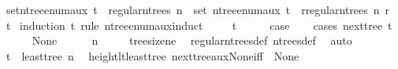 \begin{isabellebody}
{\isafoldproof}%
%
\isadelimproof
\isanewline
%
\endisadelimproof
\isanewline
{}\isamarkupfalse%
\ set{\isacharunderscore}{\kern0pt}n{\isacharunderscore}{\kern0pt}tree{\isacharunderscore}{\kern0pt}enum{\isacharunderscore}{\kern0pt}aux{\isacharcolon}{\kern0pt}\ {\isachardoublequoteopen}t\ {\isasymin}\ regular{\isacharunderscore}{\kern0pt}n{\isacharunderscore}{\kern0pt}trees\ n\ {\isasymLongrightarrow}\ set\ {\isacharparenleft}{\kern0pt}n{\isacharunderscore}{\kern0pt}tree{\isacharunderscore}{\kern0pt}enum{\isacharunderscore}{\kern0pt}aux\ t{\isacharparenright}{\kern0pt}\ {\isacharequal}{\kern0pt}\ {\isacharbraceleft}{\kern0pt}r{\isasymin}regular{\isacharunderscore}{\kern0pt}n{\isacharunderscore}{\kern0pt}trees\ n{\isachardot}{\kern0pt}\ r\ {\isasymle}\ t{\isacharbraceright}{\kern0pt}{\isachardoublequoteclose}\isanewline
%
\isadelimproof
%
\endisadelimproof
%
\isatagproof
{}\isamarkupfalse%
\ {\isacharparenleft}{\kern0pt}induction\ t\ rule{\isacharcolon}{\kern0pt}\ n{\isacharunderscore}{\kern0pt}tree{\isacharunderscore}{\kern0pt}enum{\isacharunderscore}{\kern0pt}aux{\isachardot}{\kern0pt}induct{\isacharparenright}{\kern0pt}\isanewline
\ \ \isamarkupfalse%
\ {\isacharparenleft}{\kern0pt}{}\ t{\isacharparenright}{\kern0pt}\isanewline
\ \ \isamarkupfalse%
\ \isamarkupfalse%
\ {\isacharquery}{\kern0pt}case\isanewline
\ \ \isamarkupfalse%
\ {\isacharparenleft}{\kern0pt}cases\ {\isachardoublequoteopen}next{\isacharunderscore}{\kern0pt}tree\ t{\isachardoublequoteclose}{\isacharparenright}{\kern0pt}\isanewline
\ \ \ \ \isamarkupfalse%
\ None\isanewline
\ \ \ \ \isamarkupfalse%
\ {\isachardoublequoteopen}n\ {\isasymnoteq}\ {}{\isachardoublequoteclose}\ \isamarkupfalse%
\ {}{\isacharparenleft}{\kern0pt}{}{\isacharparenright}{\kern0pt}\ tree{\isacharunderscore}{\kern0pt}size{\isacharunderscore}{\kern0pt}ne{\isacharunderscore}{\kern0pt}{}\ \isamarkupfalse%
\ regular{\isacharunderscore}{\kern0pt}n{\isacharunderscore}{\kern0pt}trees{\isacharunderscore}{\kern0pt}def\ n{\isacharunderscore}{\kern0pt}trees{\isacharunderscore}{\kern0pt}def\ \isamarkupfalse%
\ auto\isanewline
\ \ \ \ \isamarkupfalse%
\ {\isachardoublequoteopen}t\ {\isacharequal}{\kern0pt}\ least{\isacharunderscore}{\kern0pt}tree\ n{\isachardoublequoteclose}\ \isamarkupfalse%
\ height{\isacharunderscore}{\kern0pt}lt{\isacharunderscore}{\kern0pt}{}{\isacharunderscore}{\kern0pt}least{\isacharunderscore}{\kern0pt}tree\ next{\isacharunderscore}{\kern0pt}tree{\isacharunderscore}{\kern0pt}aux{\isacharunderscore}{\kern0pt}None{\isacharunderscore}{\kern0pt}iff\ {}\ None\ \isamarkupfalse%

\end{isabellebody}
